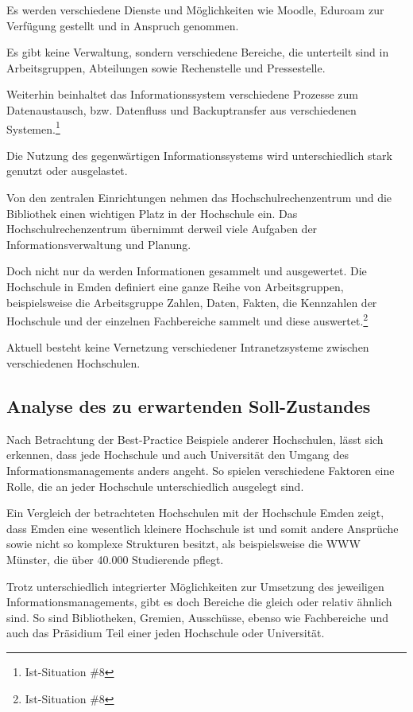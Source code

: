Es werden verschiedene Dienste und Möglichkeiten wie Moodle, Eduroam zur Verfügung gestellt und in Anspruch genommen.

Es gibt keine Verwaltung, sondern verschiedene Bereiche, die unterteilt sind in Arbeitsgruppen, Abteilungen sowie Rechenstelle und Pressestelle.

Weiterhin beinhaltet das Informationssystem verschiedene Prozesse zum Datenaustausch, bzw. Datenfluss und Backuptransfer  aus verschiedenen Systemen.\footnote{Ist-Situation \#8}

Die Nutzung des gegenwärtigen Informationssystems wird unterschiedlich stark genutzt oder ausgelastet.

Von den zentralen Einrichtungen nehmen das Hochschulrechenzentrum und die Bibliothek einen wichtigen Platz in der Hochschule ein. Das Hochschulrechenzentrum übernimmt derweil viele Aufgaben der Informationsverwaltung und Planung.

Doch nicht nur da werden Informationen gesammelt und  ausgewertet. Die Hochschule in Emden definiert eine ganze Reihe von Arbeitsgruppen, beispielsweise die Arbeitsgruppe Zahlen, Daten, Fakten, die Kennzahlen der Hochschule und der einzelnen Fachbereiche sammelt und diese auswertet.\footnote{Ist-Situation \#8}

Aktuell besteht keine Vernetzung verschiedener Intranetzsysteme zwischen verschiedenen Hochschulen.

\subsection{Analyse des zu erwartenden Soll-Zustandes}
Nach Betrachtung der Best-Practice Beispiele anderer Hochschulen, lässt sich erkennen, dass jede Hochschule und auch Universität den Umgang des Informationsmanagements anders angeht. So spielen verschiedene Faktoren eine Rolle, die an jeder Hochschule unterschiedlich ausgelegt sind.

Ein Vergleich der betrachteten Hochschulen mit der Hochschule Emden zeigt, dass Emden eine wesentlich kleinere Hochschule ist und somit andere Ansprüche sowie nicht so komplexe Strukturen besitzt, als beispielsweise die WWW Münster, die über 40.000 Studierende pflegt.

Trotz unterschiedlich integrierter Möglichkeiten zur Umsetzung des jeweiligen Informationsmanagements, gibt es doch Bereiche die gleich oder relativ ähnlich sind. So sind Bibliotheken, Gremien, Ausschüsse, ebenso wie Fachbereiche und auch das Präsidium Teil einer jeden Hochschule oder Universität.

